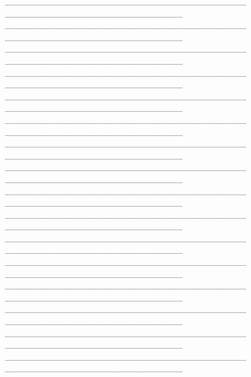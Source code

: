 \begin{enumerate}
    \_\_\_\_\_\_\_\_\_\_\_\_\_\_\_\_\_\_\_\_\_\_\_\_\_\_\_\_\_\_\_\_\_\_\_\_\_\_
    \!\!\_\_\_\_\_\_\_\_\_\_\_\_\_\_\_\_\_\_\_\_\_\_\_\_\_\_\_\_\\
    \_\_\_\_\_\_\_\_\_\_\_\_\_\_\_\_\_\_\_\_\_\_\_\_\_\_\_\_\_\_\_\_\_\_\_\_\_\_
    \!\!\_\_\_\_\_\_\_\_\_\_\_\_\_\_\_\_\_\_\_\_\_\_\_\_\_\_\_\_\\
    \_\_\_\_\_\_\_\_\_\_\_\_\_\_\_\_\_\_\_\_\_\_\_\_\_\_\_\_\_\_\_\_\_\_\_\_\_\_
    \!\!\_\_\_\_\_\_\_\_\_\_\_\_\_\_\_\_\_\_\_\_\_\_\_\_\_\_\_\_\\
    \_\_\_\_\_\_\_\_\_\_\_\_\_\_\_\_\_\_\_\_\_\_\_\_\_\_\_\_\_\_\_\_\_\_\_\_\_\_
    \!\!\_\_\_\_\_\_\_\_\_\_\_\_\_\_\_\_\_\_\_\_\_\_\_\_\_\_\_\_\\
    \_\_\_\_\_\_\_\_\_\_\_\_\_\_\_\_\_\_\_\_\_\_\_\_\_\_\_\_\_\_\_\_\_\_\_\_\_\_
    \!\!\_\_\_\_\_\_\_\_\_\_\_\_\_\_\_\_\_\_\_\_\_\_\_\_\_\_\_\_\\
    \_\_\_\_\_\_\_\_\_\_\_\_\_\_\_\_\_\_\_\_\_\_\_\_\_\_\_\_\_\_\_\_\_\_\_\_\_\_
    \!\!\_\_\_\_\_\_\_\_\_\_\_\_\_\_\_\_\_\_\_\_\_\_\_\_\_\_\_\_\\
    \_\_\_\_\_\_\_\_\_\_\_\_\_\_\_\_\_\_\_\_\_\_\_\_\_\_\_\_\_\_\_\_\_\_\_\_\_\_
    \!\!\_\_\_\_\_\_\_\_\_\_\_\_\_\_\_\_\_\_\_\_\_\_\_\_\_\_\_\_\\
    \_\_\_\_\_\_\_\_\_\_\_\_\_\_\_\_\_\_\_\_\_\_\_\_\_\_\_\_\_\_\_\_\_\_\_\_\_\_
    \!\!\_\_\_\_\_\_\_\_\_\_\_\_\_\_\_\_\_\_\_\_\_\_\_\_\_\_\_\_\\
    \_\_\_\_\_\_\_\_\_\_\_\_\_\_\_\_\_\_\_\_\_\_\_\_\_\_\_\_\_\_\_\_\_\_\_\_\_\_
    \!\!\_\_\_\_\_\_\_\_\_\_\_\_\_\_\_\_\_\_\_\_\_\_\_\_\_\_\_\_\\
    \_\_\_\_\_\_\_\_\_\_\_\_\_\_\_\_\_\_\_\_\_\_\_\_\_\_\_\_\_\_\_\_\_\_\_\_\_\_
    \!\!\_\_\_\_\_\_\_\_\_\_\_\_\_\_\_\_\_\_\_\_\_\_\_\_\_\_\_\_\\
    \_\_\_\_\_\_\_\_\_\_\_\_\_\_\_\_\_\_\_\_\_\_\_\_\_\_\_\_\_\_\_\_\_\_\_\_\_\_
    \!\!\_\_\_\_\_\_\_\_\_\_\_\_\_\_\_\_\_\_\_\_\_\_\_\_\_\_\_\_\\
    \_\_\_\_\_\_\_\_\_\_\_\_\_\_\_\_\_\_\_\_\_\_\_\_\_\_\_\_\_\_\_\_\_\_\_\_\_\_
    \!\!\_\_\_\_\_\_\_\_\_\_\_\_\_\_\_\_\_\_\_\_\_\_\_\_\_\_\_\_\\
    \_\_\_\_\_\_\_\_\_\_\_\_\_\_\_\_\_\_\_\_\_\_\_\_\_\_\_\_\_\_\_\_\_\_\_\_\_\_
    \!\!\_\_\_\_\_\_\_\_\_\_\_\_\_\_\_\_\_\_\_\_\_\_\_\_\_\_\_\_\\
    \_\_\_\_\_\_\_\_\_\_\_\_\_\_\_\_\_\_\_\_\_\_\_\_\_\_\_\_\_\_\_\_\_\_\_\_\_\_
    \!\!\_\_\_\_\_\_\_\_\_\_\_\_\_\_\_\_\_\_\_\_\_\_\_\_\_\_\_\_\\
    \_\_\_\_\_\_\_\_\_\_\_\_\_\_\_\_\_\_\_\_\_\_\_\_\_\_\_\_\_\_\_\_\_\_\_\_\_\_
    \!\!\_\_\_\_\_\_\_\_\_\_\_\_\_\_\_\_\_\_\_\_\_\_\_\_\_\_\_\_\\
    \_\_\_\_\_\_\_\_\_\_\_\_\_\_\_\_\_\_\_\_\_\_\_\_\_\_\_\_\_\_\_\_\_\_\_\_\_\_
    \!\!\_\_\_\_\_\_\_\_\_\_\_\_\_\_\_\_\_\_\_\_\_\_\_\_\_\_\_\_\\
        

\end{enumerate}
